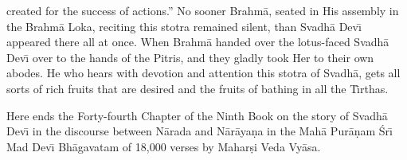 created for the success of actions.'' No sooner Brahm\=a, seated in His assembly in the Brahm\=a Loka, reciting this stotra remained silent, than Svadh\=a Dev\={\i} appeared there all at once. When Brahm\=a handed over the lotus-faced Svadh\=a Dev\={\i} over to the hands of the Pitris, and they gladly took Her to their own abodes. He who hears with devotion and attention this stotra of Svadh\=a, gets all sorts of rich fruits that are desired and the fruits of bathing in all the T\={\i}rthas.

Here ends the Forty-fourth Chapter of the Ninth Book on the story of Svadh\=a Dev\={\i} in the discourse between N\=arada and N\=ar\=aya\d{n}a in the Mah\=a Pur\=a\d{n}am \'Sr\={\i} Mad Dev\={\i} Bh\=agavatam of 18,000 verses by Mahar\d{s}i Veda Vy\=asa.



